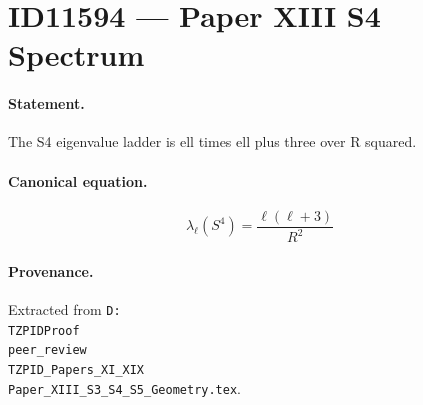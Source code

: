 \section*{ID11594 --- Paper XIII S4 Spectrum}

\paragraph{Statement.}
The S4 eigenvalue ladder is ell times ell plus three over R squared.

\paragraph{Canonical equation.}
\[
\lambda_\ell(S^4)=\frac{\ell(\ell+3)}{R^2}
\]

\paragraph{Provenance.}
Extracted from \texttt{D:\\TZPIDProof\\peer\_review\\TZPID\_Papers\_XI\_XIX\\Paper\_XIII\_S3\_S4\_S5\_Geometry.tex}.
